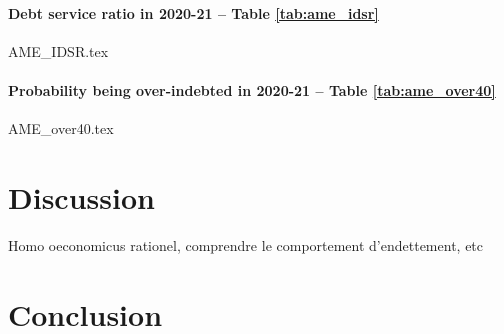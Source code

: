 \documentclass[a4paper, 11pt, onecolumn]{article}
\begin{document}
\clearpage
\newpage
\paragraph*{Debt service ratio in 2020-21 -- Table \ref{tab:ame_idsr}}

{AME_IDSR.tex}





\clearpage
\newpage
\paragraph*{Probability being over-indebted in 2020-21 -- Table \ref{tab:ame_over40}}

{AME_over40.tex}






\section{Discussion}

Homo oeconomicus rationel, comprendre le comportement d'endettement, etc


\section{Conclusion}
\label{Conclusion}




%



\newpage
\appendix
\end{document}
